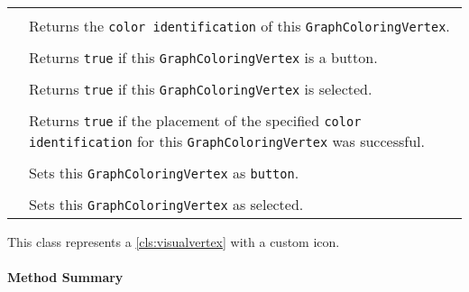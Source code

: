 \paragraph*{}
\begin{longtable}{Lp{10cm}}
	\startmethodtable
	 \\
	& Returns the \texttt{color identification} of this \texttt{GraphColoringVertex}. \\
	 \\
	& Returns \texttt{true} if this \texttt{GraphColoringVertex} is a button. \\
	 \\
	& Returns \texttt{true} if this \texttt{GraphColoringVertex} is selected. \\
	 \\
	& Returns \texttt{true} if the placement of the specified \texttt{color identification} for this \texttt{GraphColoringVertex} was successful. \\
	 \\
	& Sets this \texttt{GraphColoringVertex} as \texttt{button}. \\
	 \\
	& Sets this \texttt{GraphColoringVertex} as selected. \\
	\hline
\end{longtable}

This class represents a \ref{cls:visualvertex} with a custom icon. \\


\centerdash

\paragraph*{Method Summary}
